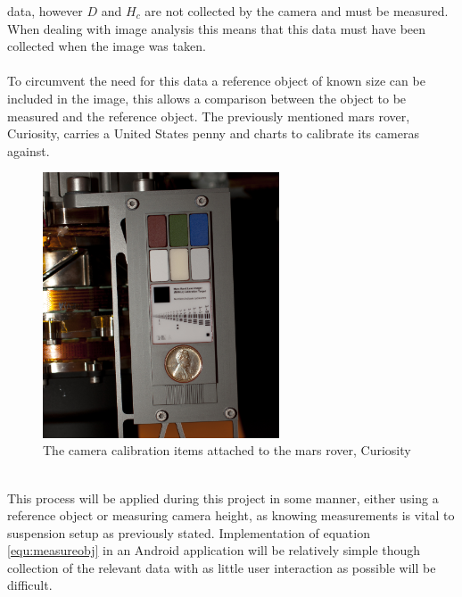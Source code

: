 	data, however $D$ and $H_{c}$ are not collected by the camera and must be measured. When 
	dealing with image analysis this means that this data must have been collected when the image 
	was taken.
	\\\\
	To circumvent the need for this data a reference object of known size can be included in the 
	image, this allows a comparison between the object to be measured and the reference object. The 
	previously mentioned mars rover, Curiosity, carries a United States penny and charts to 
	calibrate its cameras against.
	\begin{figure}[h!]
		\centering
		\includegraphics[width=7cm]{../images/curiosity_calibration_chart.jpg}
		\caption{The camera calibration items attached to the mars rover, Curiosity}
		\label{fig:curiosity_calibration_chart}
	\end{figure} 
	\\
	This process will be applied during this project in some manner, either using a reference object or measuring camera height, as knowing measurements is vital to suspension setup as previously stated. Implementation of equation \ref{equ:measureobj} in an Android application will be relatively simple though collection of the relevant data with as little user interaction as possible will be difficult.